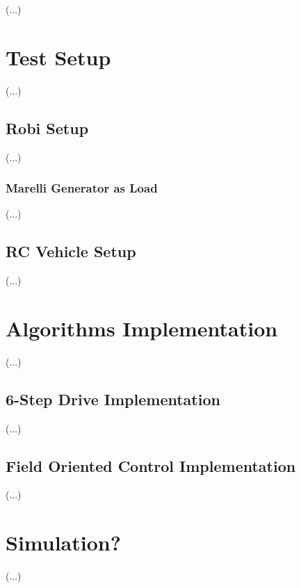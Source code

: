 (...)\\

\lipsum[14]

\section{Test Setup}

(...)\\

\lipsum[15]

\subsection{Robi Setup}

(...)\\

\lipsum[16]

\subsubsection{Marelli Generator as Load}

(...)\\

\lipsum[17]

\subsection{RC Vehicle Setup}

(...)\\

\lipsum[18]

\section{Algorithms Implementation}

(...)\\

\lipsum[19]

\subsection{6-Step Drive Implementation}

(...)\\

\lipsum[20]

\subsection{Field Oriented Control Implementation}

(...)\\

\lipsum[21]

\section{Simulation?}

(...)\\

\lipsum[22]







